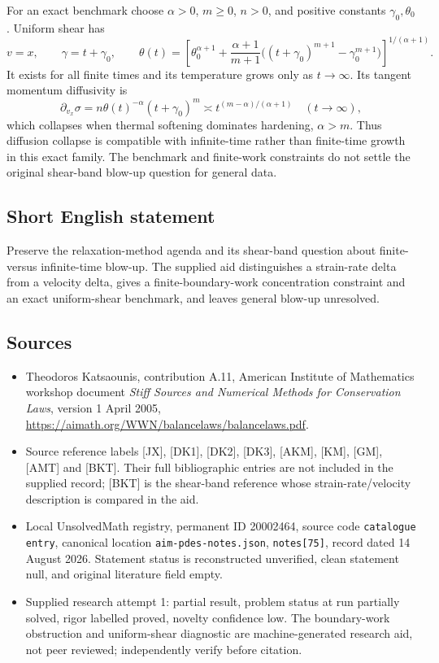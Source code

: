 \documentclass[11pt]{article}
\begin{document}
For an exact benchmark choose $\alpha>0$, $m\ge0$, $n>0$, and positive constants $\gamma_0,\theta_0$. Uniform shear has
\[
 v=x,\qquad\gamma=t+\gamma_0,\qquad
 \theta(t)=\left[\theta_0^{\alpha+1}
 +\frac{\alpha+1}{m+1}
  \bigl((t+\gamma_0)^{m+1}-\gamma_0^{m+1}\bigr)\right]^{1/(\alpha+1)}.
\]
It exists for all finite times and its temperature grows only as $t\to\infty$. Its tangent momentum diffusivity is
\[
 \partial_{v_x}\sigma
   =n\theta(t)^{-\alpha}(t+\gamma_0)^m
   \asymp t^{(m-\alpha)/(\alpha+1)}
 \quad(t\to\infty),
\]
which collapses when thermal softening dominates hardening, $\alpha>m$. Thus diffusion collapse is compatible with infinite-time rather than finite-time growth in this exact family. The benchmark and finite-work constraints do not settle the original shear-band blow-up question for general data.
\subsection{Short English statement}
Preserve the relaxation-method agenda and its shear-band question about finite- versus infinite-time blow-up. The supplied aid distinguishes a strain-rate delta from a velocity delta, gives a finite-boundary-work concentration constraint and an exact uniform-shear benchmark, and leaves general blow-up unresolved.
\subsection{Sources}
\begin{itemize}
\item Theodoros Katsaounis, contribution A.11, American Institute of Mathematics workshop document \emph{Stiff Sources and Numerical Methods for Conservation Laws}, version 1 April 2005, \url{https://aimath.org/WWN/balancelaws/balancelaws.pdf}.
\item Source reference labels [JX], [DK1], [DK2], [DK3], [AKM], [KM], [GM], [AMT] and [BKT]. Their full bibliographic entries are not included in the supplied record; [BKT] is the shear-band reference whose strain-rate/velocity description is compared in the aid.
\item Local UnsolvedMath registry, permanent ID 20002464, source code \texttt{catalogue entry}, canonical location \texttt{aim-pdes-notes.json}, \texttt{notes[75]}, record dated 14 August 2026. Statement status is reconstructed unverified, clean statement null, and original literature field empty.
\item Supplied research attempt 1: partial result, problem status at run partially solved, rigor labelled proved, novelty confidence low. The boundary-work obstruction and uniform-shear diagnostic are machine-generated research aid, not peer reviewed; independently verify before citation.
\end{itemize}
\end{document}
